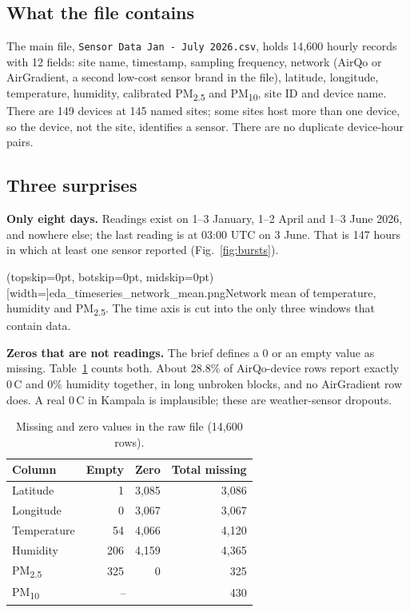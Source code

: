 \documentclass{ieeeaccess}
\newcommand{\pmtwo}{PM\textsubscript{2.5}}
\newcommand{\pmten}{PM\textsubscript{10}}
\begin{document}
\subsection{What the file contains}
The main file, \texttt{Sensor Data Jan - July 2026.csv}, holds 14{,}600 hourly records with 12 fields: site name, timestamp, sampling frequency, network (AirQo or AirGradient, a second low-cost sensor brand in the file), latitude, longitude, temperature, humidity, calibrated \pmtwo{} and \pmten{}, site ID and device name. There are 149 devices at 145 named sites; some sites host more than one device, so the device, not the site, identifies a sensor. There are no duplicate device-hour pairs.

\subsection{Three surprises}
\textbf{Only eight days.} Readings exist on 1--3 January, 1--2 April and 1--3 June 2026, and nowhere else; the last reading is at 03:00 UTC on 3 June. That is 147 hours in which at least one sensor reported (Fig.~\ref{fig:bursts}).

\Figure[t!](topskip=0pt, botskip=0pt, midskip=0pt)[width=\textwidth]{eda_timeseries_network_mean.png}{Network mean of temperature, humidity and \pmtwo{}. The time axis is cut into the only three windows that contain data.\label{fig:bursts}}

\textbf{Zeros that are not readings.} The brief defines a 0 or an empty value as missing. Table~\ref{tab:missing} counts both. About 28.8\% of AirQo-device rows report exactly 0\,\textdegree C and 0\% humidity together, in long unbroken blocks, and no AirGradient row does. A real 0\,\textdegree C in Kampala is implausible; these are weather-sensor dropouts.

\begin{table}[t]
\caption{Missing and zero values in the raw file (14{,}600 rows).}
\label{tab:missing}
\centering
\begin{tabular}{lrrr}
\toprule
Column & Empty & Zero & Total missing \\
\midrule
Latitude & 1 & 3{,}085 & 3{,}086 \\
Longitude & 0 & 3{,}067 & 3{,}067 \\
Temperature & 54 & 4{,}066 & 4{,}120 \\
Humidity & 206 & 4{,}159 & 4{,}365 \\
\pmtwo{} & 325 & 0 & 325 \\
\pmten{} & \multicolumn{2}{c}{--} & 430 \\
\bottomrule
\end{tabular}
\end{table}
\end{document}

